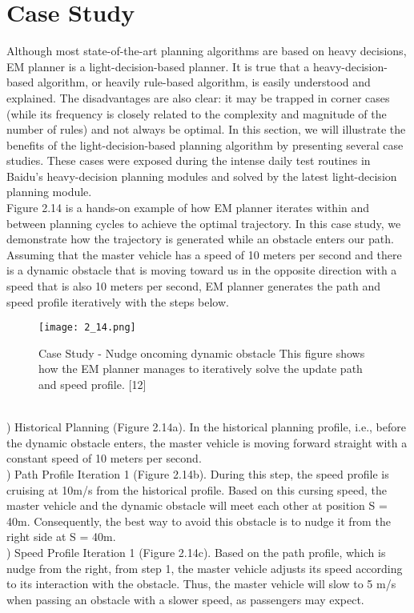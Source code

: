 \documentclass{thesisreport}
\begin{document}
\section{Case Study}
Although most state-of-the-art planning algorithms are based on heavy decisions, EM planner is a light-decision-based planner. It is true that a heavy-decision-based algorithm, or heavily rule-based algorithm, is easily understood and explained. The disadvantages are also clear: it may be trapped in corner cases (while its frequency is closely related to the complexity and magnitude of the number of rules) and not always be optimal. In this section, we will illustrate the benefits of the light-decision-based planning algorithm by presenting several case studies. These cases were exposed during the intense daily test routines in Baidu’s heavy-decision planning modules and solved by the latest light-decision planning module.\\
\indent
Figure 2.14 is a hands-on example of how EM
planner iterates within and between planning cycles to achieve the optimal trajectory. In this case study, we demonstrate how the trajectory is generated while an obstacle enters our path. Assuming that the master vehicle has a speed of 10 meters per second and there is a dynamic obstacle that is moving toward us in the opposite direction with a speed that is also 10 meters per second, EM planner generates the path and speed profile iteratively with the steps below.
\begin{figure}[ht]
	\centering
	\texttt{[image: 2\_14.png]}
	\caption{Case Study - Nudge oncoming dynamic obstacle This figure shows how the EM planner manages to iteratively solve the update path and speed profile. [12]}
	\label{fig:2.14} 
\end{figure}\\
) Historical Planning (Figure 2.14a). In the historical planning profile, i.e., before the dynamic obstacle enters, the master vehicle
is moving forward straight with a constant
speed of 10 meters per second.\\
) Path Profile Iteration 1 (Figure 2.14b). During this step, the speed profile is cruising at 10m/s from the historical profile. Based on this cursing speed, the master vehicle and the dynamic obstacle will meet each other at
position S = 40m. Consequently, the best
way to avoid this obstacle is to nudge it from the right side at S = 40m.\\
) Speed Profile Iteration 1 (Figure 2.14c). Based on the path profile, which is nudge from the right, from step 1, the master vehicle adjusts its speed according to its interaction with the obstacle. Thus, the master vehicle will slow to 5 m/s when passing an obstacle with a slower speed, as passengers may expect.\\
\end{document}
